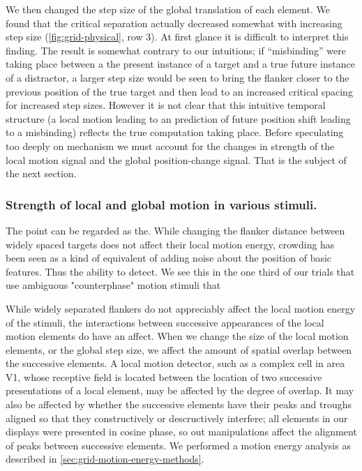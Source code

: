 \documentclass[../manuscript]{subfiles}
\begin{document}
We then changed the step size of the global translation of each element. We found that the critical separation actually decreased somewhat with increasing step size (\autoref{fig:grid-physical}, row 3). At first glance it is difficult to interpret this finding. The result is somewhat contrary to our intuitions; if
``misbinding'' were taking place between a the present instance of a target and a true future instance of a distractor, a larger step size would be seen to bring the flanker closer to the previous position of the true target and then lead to an increased critical spacing for increased step sizes.  However it is not clear that this intuitive temporal structure (a local motion leading to an prediction of future position shift leading to a misbinding) reflects the true computation taking place. Before speculating too deeply on mechanism we must account for the changes in strength of the local motion signal and the global position-change signal. That is the subject of the next section.

\subsubsection{Strength of local and global motion in various stimuli.}
\label{sec:motion-energy}

The point can be regarded as the. While changing the flanker distance between widely spaced targets does not affect their local motion energy, crowding has been seen as a kind of equivalent of adding noise about the position of basic features. Thus the ability to detect. We see this in the one third of our trials that use ambiguous "counterphase" motion stimuli that 

While widely separated flankers do not appreciably affect the local motion energy of the stimuli, the interactions between successive appearances of the local motion elements do have an affect. When we change the size of the local motion elements, or the global step size, we affect the amount of spatial overlap between the successive elements. A local motion detector, such as a complex cell in area V1, whose receptive field is located between
the location of two successive presentations of a local element,
may be affected by the degree of overlap. It may also be affected by whether the successive elements have their peaks and troughs aligned so that they constructively or descructively interfere; all elements in our displays were presented in cosine phase, so out manipulations affect the alignment of peaks between successive elements. We performed a motion energy analysis as described in \autoref{sec:grid-motion-energy-methods}. 
\end{document}
